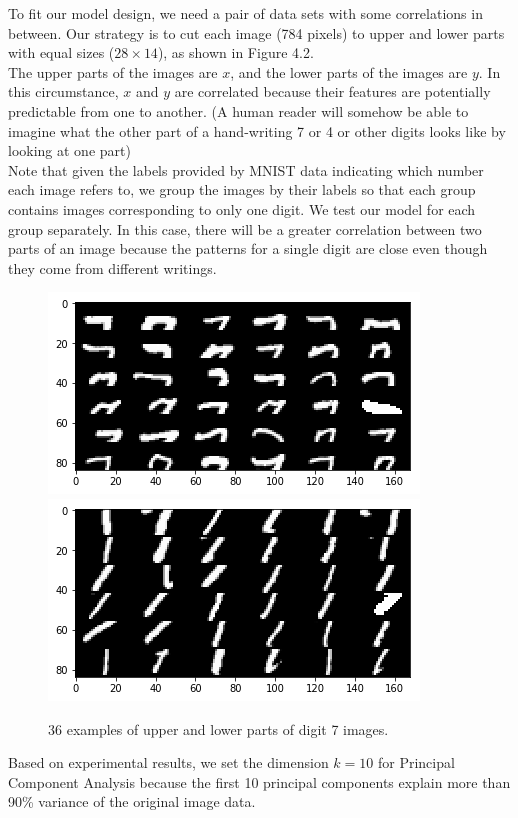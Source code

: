 \documentclass[12pt]{report} %
\begin{document}
To fit our model design, we need a pair of data sets with some correlations in between. Our strategy is to cut each image (784 pixels) to upper and lower parts with equal sizes ($28 \times 14$), as shown in Figure 4.2. \\
The upper parts of the images are $x$, and the lower parts of the images are $y$. In this circumstance, $x$ and $y$ are correlated because their features are potentially predictable from one to another. (A human reader will somehow be able to imagine what the other part of a hand-writing 7 or 4 or other digits looks like by looking at one part)\\
Note that given the labels provided by MNIST data indicating which number each image refers to, we group the images by their labels so that each group contains images corresponding to only one digit. We test our model for each group separately. In this case, there will be a greater correlation between two parts of an image because the patterns for a single digit are close even though they come from different writings.
\begin{figure}[H]
	\centering
	\includegraphics[scale=0.8]{pictures/MNIST_up.png}
	\includegraphics[scale=0.8]{pictures/MNIST_down.png}
	\caption{36 examples of upper and lower parts of digit 7 images.}
	\label{fig:2}
\end{figure}
Based on experimental results, we set the dimension $k=10$ for Principal Component Analysis because the first 10 principal components explain more than 90\% variance of the original image data.
\end{document}
